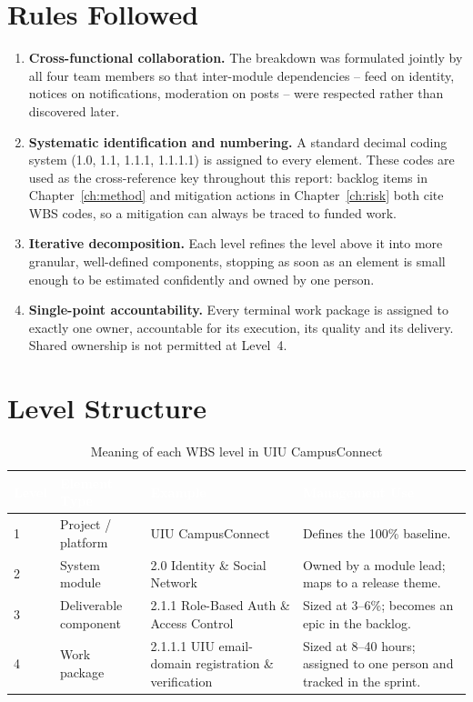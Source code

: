 \documentclass[11pt,a4paper]{report}
\newcommand{\thead}[1]{\textcolor{white}{\sffamily\bfseries #1}}
\newcommand{\rowhead}{\rowcolor{headRow}}
\begin{document}
\section{Rules Followed}

\begin{enumerate}[leftmargin=*,itemsep=7pt]
  \item \textbf{Cross-functional collaboration.} The breakdown was formulated
  jointly by all four team members so that inter-module dependencies -- feed on
  identity, notices on notifications, moderation on posts -- were respected
  rather than discovered later.

  \item \textbf{Systematic identification and numbering.} A standard decimal
  coding system (1.0, 1.1, 1.1.1, 1.1.1.1) is assigned to every element. These
  codes are used as the cross-reference key throughout this report: backlog items
  in Chapter~\ref{ch:method} and mitigation actions in Chapter~\ref{ch:risk} both
  cite WBS codes, so a mitigation can always be traced to funded work.

  \item \textbf{Iterative decomposition.} Each level refines the level above it
  into more granular, well-defined components, stopping as soon as an element is
  small enough to be estimated confidently and owned by one person.

  \item \textbf{Single-point accountability.} Every terminal work package is
  assigned to exactly one owner, accountable for its execution, its quality and
  its delivery. Shared ownership is not permitted at Level~4.
\end{enumerate}

\section{Level Structure}

\begin{table}[htbp]
\centering
\caption{Meaning of each WBS level in UIU CampusConnect}
\label{tab:levels}
\begin{tabular}{|C{1.5cm}|L{3.3cm}|L{4.0cm}|L{5.6cm}|}
\hline
\rowhead \thead{Level} & \thead{Element Type} & \thead{Example} & \thead{Management Use} \\  & Project / platform & UIU CampusConnect & Defines the 100\% baseline. \\ \hline
{}
2 & System module & 2.0 Identity \& Social Network & Owned by a module lead; maps to a release theme. \\  & Deliverable component & 2.1.1 Role-Based Auth \& Access Control & Sized at 3--6\%; becomes an epic in the backlog. \\ \hline
{}
4 & Work package & 2.1.1.1 UIU email-domain registration \& verification & Sized at 8--40 hours; assigned to one person and tracked in the sprint. \\ \hline
\end{tabular}
\end{table}
\end{document}
